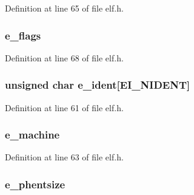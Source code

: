Definition at line 65 of file elf.\-h.

\hypertarget{struct_elf64___ehdr_a23ee84e40f0f22eb20daffa985c0cef0}{
\subsubsection[{e\-\_\-flags}]{ e\-\_\-flags}}\label{struct_elf64___ehdr_a23ee84e40f0f22eb20daffa985c0cef0}


Definition at line 68 of file elf.\-h.

\hypertarget{struct_elf64___ehdr_a989deb32d9be1514da87d64e8698600a}{
\subsubsection[{e\-\_\-ident}]{\setlength{\rightskip}{0pt plus 5cm}unsigned char e\-\_\-ident\mbox{[}{\bf E\-I\-\_\-\-N\-I\-D\-E\-N\-T}\mbox{]}}}\label{struct_elf64___ehdr_a989deb32d9be1514da87d64e8698600a}


Definition at line 61 of file elf.\-h.

\hypertarget{struct_elf64___ehdr_a01538541f18c03e0ebfd8d396dc3b0eb}{
\subsubsection[{e\-\_\-machine}]{ e\-\_\-machine}}\label{struct_elf64___ehdr_a01538541f18c03e0ebfd8d396dc3b0eb}


Definition at line 63 of file elf.\-h.

\hypertarget{struct_elf64___ehdr_a5381f6c68941e0b6da34dc5612c43449}{
\subsubsection[{e\-\_\-phentsize}]{ e\-\_\-phentsize}}\label{struct_elf64___ehdr_a5381f6c68941e0b6da34dc5612c43449}


